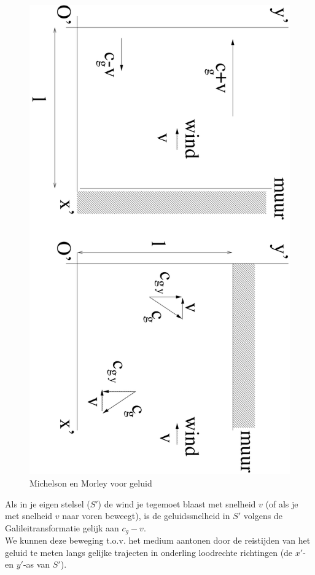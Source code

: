\begin{figure}[ht]
\centering
\includegraphics[width=1.0\textwidth]{oefeningen.pictures/wind}
\caption{Michelson en Morley voor geluid}
\label{f:oef1-6}
\end{figure}


Als  in je eigen stelsel ($S'$) de wind je tegemoet blaast met snelheid 
$v$ (of als je met snelheid $v$  naar  voren  beweegt),  is  de  
geluidssnelheid  in  $S'$  volgens de Galileitransformatie gelijk aan 
$c_{g}-v$.\\
We kunnen deze beweging t.o.v. het medium aantonen door de reistijden van het
geluid te meten langs gelijke trajecten in onderling loodrechte
richtingen (de $x'$- en $y'$-as van $S'$).



